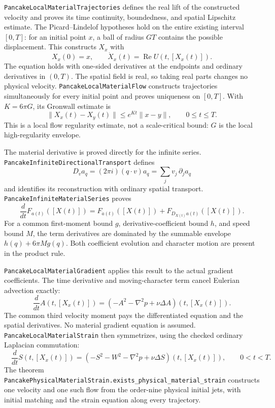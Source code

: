 \documentclass[11pt]{article}
\theoremstyle{definition}
\begin{document}
\texttt{PancakeLocalMaterialTrajectories} defines the real lift of the
constructed velocity and proves its time continuity, boundedness, and
spatial Lipschitz estimate. The Picard--Lindelof hypotheses hold on the
entire existing interval $[0,T]$: for an initial point $x$, a ball of
radius $GT$ contains the possible displacement. This constructs $X_x$
with
\[
 X_x(0)=x,\qquad
 \dot X_x(t)=\operatorname{Re}U(t,[X_x(t)]).
\]
The equation holds with one-sided derivatives at the endpoints and
ordinary derivatives in $(0,T)$. The spatial field is real, so taking
real parts changes no physical velocity.
\texttt{PancakeLocalMaterialFlow} constructs trajectories simultaneously
for every initial point and proves uniqueness on $[0,T]$. With
$K=6\pi G$, its Gronwall estimate is
\[
 \|X_x(t)-X_y(t)\|\le e^{Kt}\|x-y\|,\qquad 0\le t\le T.
\]
This is a local flow regularity estimate, not a scale-critical bound:
$G$ is the local high-regularity envelope.

The material derivative is proved directly for the infinite series.
\texttt{PancakeInfiniteDirectionalTransport} defines
\[
 D_v a_q=(2\pi i)(q\cdot v)a_q
       =\sum_j v_j\,\partial_j a_q
\]
and identifies its reconstruction with ordinary spatial transport.
\texttt{PancakeInfiniteMaterialSeries} proves
\[
 \frac{d}{dt}F_{a(t)}([X(t)])
       =F_{\dot a(t)}([X(t)])+F_{D_{\dot X(t)}a(t)}([X(t)]).
\]
For a common first-moment bound $g$, derivative-coefficient bound $h$,
and speed bound $M$, the term derivatives are dominated by the summable
envelope $h(q)+6\pi M g(q)$. Both coefficient evolution and character
motion are present in the product rule.

\texttt{PancakeLocalMaterialGradient} applies this result to the actual
gradient coefficients. The time derivative and moving-character term
cancel Eulerian advection exactly:
\[
 \frac{d}{dt}A(t,[X_x(t)])
       =(-A^2-\nabla^2p+\nu\Delta A)(t,[X_x(t)]).
\]
The common third velocity moment pays the differentiated equation and
the spatial derivatives. No material gradient equation is assumed.
\texttt{PancakeLocalMaterialStrain} then symmetrizes, using the checked
ordinary Laplacian commutation:
\[
 \boxed{\quad
 \frac{d}{dt}S(t,[X_x(t)])
       =(-S^2-W^2-\nabla^2p+\nu\Delta S)(t,[X_x(t)]),
       \qquad 0<t<T.
 \quad}
\]
The theorem
\texttt{PancakePhysicalMaterialStrain.exists\_physical\_material\_strain}
constructs one velocity and one such flow from the order-nine physical
initial jets, with initial matching and the strain equation along every
trajectory.
\end{document}
